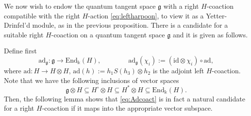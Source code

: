 \documentclass{article}
\theoremstyle{definition}
\begin{document}
	We now wish to endow the quantum tangent space $\mathfrak{g}$ with a right $H$-coaction compatible with the right $H$-action \eqref{eq:leftharpoon}, to view it as a Yetter-Drinfel'd module, as in the previous proposition.
	There is a candidate for a suitable right $H$-coaction on a quantum tangent space $\mathfrak{g}$ and it is given as follows.
	
	Define first
	\begin{equation}\label{eq:Adcoact}
		\mathrm{ad}_\mathfrak{g}\colon\mathfrak{g}\to\mathrm{End}_\Bbbk(H),\qquad\qquad\mathrm{ad}_\mathfrak{g}(\chi_i):=(\mathrm{id}\otimes\chi_i)\circ\mathrm{ad},
	\end{equation}
	where $\mathrm{ad}\colon H\to H\otimes H$, $\mathrm{ad}(h):=h_1S(h_3)\otimes h_2$ is the adjoint left $H$-coaction. Note that we have the following inclusions of vector spaces
	$$
	\mathfrak{g}\otimes H\subseteq H^\circ\otimes H\subseteq H^*\otimes H\subseteq\mathrm{End}_\Bbbk(H).
	$$
	Then, the following lemma shows that \eqref{eq:Adcoact} is in fact a natural candidate for a right $H$-coaction if 
	it maps into the appropriate vector subspace.
	
\end{document}
